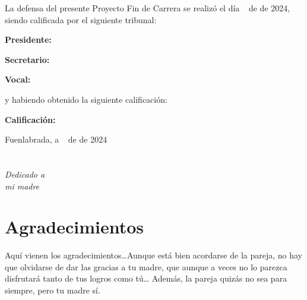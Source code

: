 \documentclass[a4paper, 12pt]{book}
\begin{document}
\vspace{1cm}
La defensa del presente Proyecto Fin de Carrera se realizó el día \qquad$\;\,$ de \qquad\qquad\qquad\qquad \newline de 2024, siendo calificada por el siguiente tribunal:


\vspace{0.5cm}
\textbf{Presidente:}

\vspace{1.2cm}
\textbf{Secretario:}

\vspace{1.2cm}
\textbf{Vocal:}


\vspace{1.2cm}
y habiendo obtenido la siguiente calificación:

\vspace{1cm}
\textbf{Calificación:}


\vspace{1cm}
\begin{flushright}
Fuenlabrada, a \qquad$\;\,$ de \qquad\qquad\qquad\qquad de 2024
\end{flushright}


\chapter*{}
\begin{flushright}
\textit{Dedicado a \\
mi madre}
\end{flushright}


\chapter*{Agradecimientos}

Aquí vienen los agradecimientos\ldots Aunque está bien acordarse de la pareja, no hay que olvidarse de dar las gracias a tu madre, que aunque a veces no lo parezca disfrutará tanto de tus logros como tú\ldots 
Además, la pareja quizás no sea para siempre, pero tu madre sí.
\end{document}
